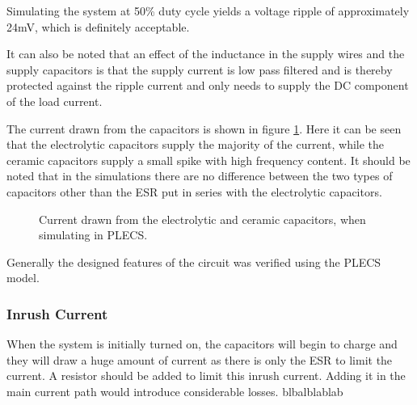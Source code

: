 Simulating the system at 50\% duty cycle yields a voltage ripple of approximately 24mV, which is definitely acceptable. 

It can also be noted that an effect of the inductance in the supply wires and the supply capacitors is that the supply current is low pass filtered and is thereby protected against the ripple current and only needs to supply the DC component of the load current.

The current drawn from the capacitors is shown in figure \ref{fig:cap_currents}.
Here it can be seen that the electrolytic capacitors supply the majority of the current, while the ceramic capacitors supply a small spike with high frequency content.
It should be noted that in the simulations there are no difference between the two types of capacitors other than the ESR put in series with the electrolytic capacitors. 

\begin{figure}[h]
	\centering
	\caption{Current drawn from the electrolytic and ceramic capacitors, when simulating in PLECS. }
	\label{fig:cap_currents}
\end{figure}

Generally the designed features of the circuit was verified using the PLECS model.


\subsubsection{Inrush Current}
\label{ssub:inrush_current}
When the system is initially turned on, the capacitors will begin to charge and they will draw a huge amount of current as there is only the ESR to limit the current. 
A resistor should be added to limit this inrush current. 
Adding it in the main current path would introduce considerable losses.
blbalblablab




